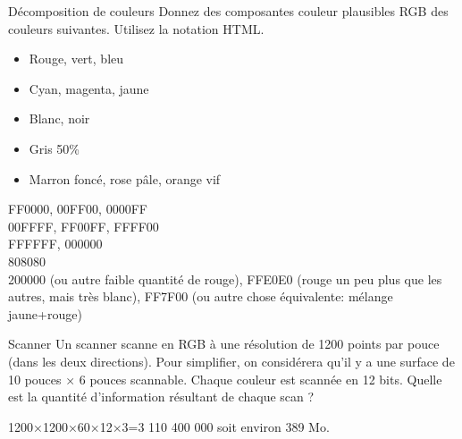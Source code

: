 \begin{exercice}
  \begin{exercicelet}{Décomposition de couleurs}
    Donnez des composantes couleur plausibles RGB des couleurs
    suivantes. Utilisez la notation HTML.
    \begin{itemize}
    \item Rouge, vert, bleu
    \item Cyan, magenta, jaune
    \item Blanc, noir
    \item Gris 50\%
    \item Marron foncé, rose pâle, orange vif
    \end{itemize}
    \begin{xcorrection}
      FF0000, 00FF00, 0000FF\\
      00FFFF, FF00FF, FFFF00\\
      FFFFFF, 000000\\
      808080\\
      200000 (ou autre faible quantité de rouge), FFE0E0 (rouge un peu plus
      que les autres, mais très blanc), FF7F00 (ou autre chose équivalente:
      mélange jaune+rouge)
    \end{xcorrection}
  \end{exercicelet}
  \begin{exercicelet}{Scanner}
    Un scanner scanne en RGB à une résolution de 1200 points par pouce (dans
    les deux directions). Pour simplifier, on considérera qu'il y a une
    surface de 10 pouces × 6 pouces scannable. Chaque couleur est scannée en
    12 bits. Quelle est la quantité d'information résultant de chaque scan ?
    \begin{xcorrection}
      1200×1200×60×12×3=3 110 400 000 soit environ 389 Mo.
    \end{xcorrection}
  \end{exercicelet}
\end{exercice}
